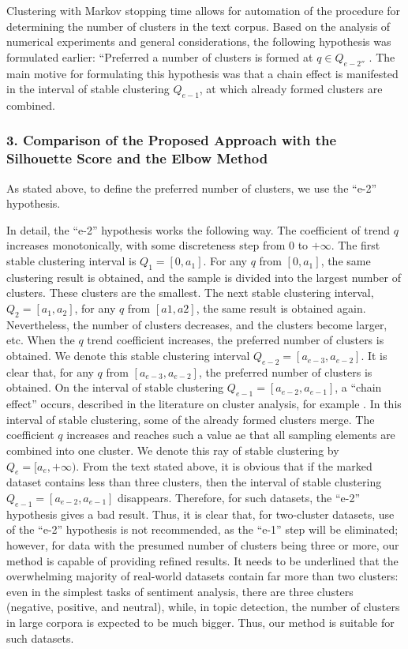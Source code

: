 Clustering with Markov stopping time allows for automation of the procedure for determining the number of clusters in the text corpus. Based on the analysis of numerical experiments and general considerations, the following hypothesis was formulated earlier: “Preferred a number of clusters is formed at \(q \in Q_{e-2''}\) \cite{Orekhov201811}. The main motive for formulating this hypothesis was that a chain effect is manifested in the interval of stable clustering \(Q_{e-1}\), at which already formed clusters are combined.

\subsubsection{3. Comparison of the Proposed Approach with the Silhouette Score and the Elbow Method}

As stated above, to define the preferred number of clusters, we use the “e-2” hypothesis.

In detail, the “e-2” hypothesis works the following way. The coefficient of trend \(q\) increases monotonically, with some discreteness step from \(0\) to \(+\infty\). The first stable clustering interval is \(Q_1 = [0, a_1]\). For any \(q\) from \([0, a_1]\), the same clustering result is obtained, and the sample is divided into the largest number of clusters. These clusters are the smallest. The next stable clustering interval, \(Q_2 = [a_1, a_2]\), for any \(q\) from \([a1, a2]\), the same result is obtained again. Nevertheless, the number of clusters decreases, and the clusters become larger, etc. When the \(q\) trend coefficient increases, the preferred number of clusters is obtained. We denote this stable clustering interval \(Q_{e-2} = [a_{e-3}, a_{e-2}]\). It is clear that, for any \(q\) from \([a_{e-3}, a_{e-2}]\), the preferred number of clusters is obtained. On the interval of stable clustering \(Q_{e-1} = [a_{e-2}, a_{e-1}]\), a “chain effect” occurs, described in the literature on cluster analysis, for example \cite{AldenderferBlashfield}. In this interval of stable clustering, some of the already formed clusters merge. The coefficient \(q\) increases and reaches such a value ae that all sampling elements are combined into one cluster. We denote this ray of stable clustering by \(Q_e = [a_e, +\infty)\). From the text stated above, it is obvious that if the marked dataset contains less than three clusters, then the interval of stable clustering \(Q_{e-1} = [a_{e-2}, a_{e-1}]\) disappears. Therefore, for such datasets, the “e-2” hypothesis gives a bad result. Thus, it is clear that, for two-cluster datasets, use of the “e-2” hypothesis is not recommended, as the “e-1” step will be eliminated; however, for data with the presumed number of clusters being three or more, our method is capable of providing refined results. It needs to be underlined that the overwhelming majority of real-world datasets contain far more than two clusters: even in the simplest tasks of sentiment analysis, there are three clusters (negative, positive, and neutral), while, in topic detection, the number of clusters in large corpora is expected to be much bigger. Thus, our method is suitable for such datasets.

